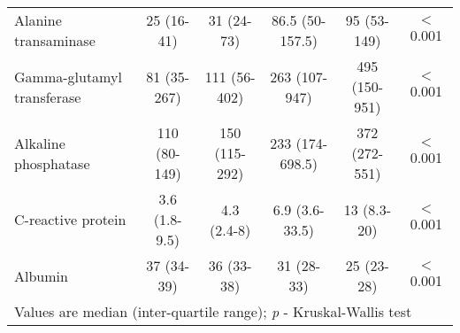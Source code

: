 \begin{sidewaystable}[p]
\begin{tabular}{| l | c c c c c|}
			Alanine transaminase       & 25 (16-41)       & 31 (24-73)       & 86.5 (50-157.5)  & 95 (53-149)      & $<$0.001 \\
			Gamma-glutamyl transferase & 81 (35-267)      & 111 (56-402)     & 263 (107-947)    & 495 (150-951)    & $<$0.001 \\
			Alkaline phosphatase       & 110 (80-149)     & 150 (115-292)    & 233 (174-698.5)  & 372 (272-551)    & $<$0.001 \\
			C-reactive protein         & 3.6 (1.8-9.5)    & 4.3 (2.4-8)      & 6.9 (3.6-33.5)   & 13 (8.3-20)      & $<$0.001 \\
			Albumin                    & 37 (34-39)       & 36 (33-38)       & 31 (28-33)       & 25 (23-28)       & $<$0.001 \\ \hline
			\multicolumn{6}{l}{Values are median (inter-quartile range); \textit{p} - Kruskal-Wallis test}
		\end{tabular}
	\end{sidewaystable}
	
	